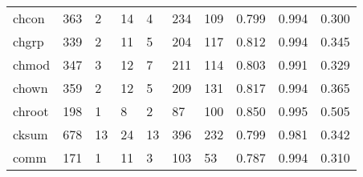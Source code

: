\begin{longtable}{lp{1.3cm}p{1.3cm}p{1.3cm}p{1.3cm}p{1.3cm}p{1.3cm}p{1.3cm}p{1.3cm}p{1.3cm}}
chcon     &                    363 &                                  2 &                                14 &                                4 &                               234 &                             109 &                                   0.799 &                                  0.994 &                                0.300 \\
chgrp     &                    339 &                                  2 &                                11 &                                5 &                               204 &                             117 &                                   0.812 &                                  0.994 &                                0.345 \\
chmod     &                    347 &                                  3 &                                12 &                                7 &                               211 &                             114 &                                   0.803 &                                  0.991 &                                0.329 \\
chown     &                    359 &                                  2 &                                12 &                                5 &                               209 &                             131 &                                   0.817 &                                  0.994 &                                0.365 \\
chroot    &                    198 &                                  1 &                                 8 &                                2 &                                87 &                             100 &                                   0.850 &                                  0.995 &                                0.505 \\
cksum     &                    678 &                                 13 &                                24 &                               13 &                               396 &                             232 &                                   0.799 &                                  0.981 &                                0.342 \\
comm      &                    171 &                                  1 &                                11 &                                3 &                               103 &                              53 &                                   0.787 &                                  0.994 &                                0.310 \\

\end{longtable}
